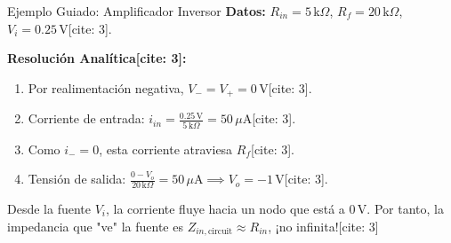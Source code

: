 \documentclass[aspectratio=169, table, xcdraw]{beamer}
\begin{document}
\begin{frame}{Ejemplo Guiado: Amplificador Inversor}
    \textbf{Datos:} $R_{in} = 5\,\text{k}\Omega$, $R_f = 20\,\text{k}\Omega$, $V_i = 0.25\,\text{V}$[cite: 3].
    
    \vspace{0.2cm}
    \textbf{Resolución Analítica[cite: 3]:}
    \begin{enumerate}
        \item Por realimentación negativa, $V_- = V_+ = 0\,\text{V}$[cite: 3].
        \item Corriente de entrada: $i_{in} = \frac{0.25\,\text{V}}{5\,\text{k}\Omega} = 50\,\mu\text{A}$[cite: 3].
        \item Como $i_- = 0$, esta corriente atraviesa $R_f$[cite: 3].
        \item Tensión de salida: $\frac{0 - V_o}{20\,\text{k}\Omega} = 50\,\mu\text{A} \implies \boxed{V_o = -1\,\text{V}}$[cite: 3].
    \end{enumerate}

    \begin{tcolorbox}[colback=ucbblue!5, colframe=ucbblue, title=Impedancia de Entrada del Circuito]
        Desde la fuente $V_i$, la corriente fluye hacia un nodo que está a $0\,\text{V}$. Por tanto, la impedancia que "ve" la fuente es $Z_{in, \text{circuit}} \approx R_{in}$, ¡no infinita![cite: 3]
    \end{tcolorbox}
\end{frame}
\end{document}
